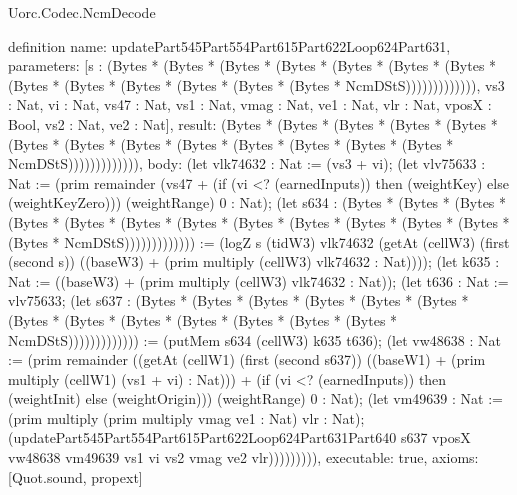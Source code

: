 \begin{lexlean}{Uorc.Codec.NcmDecode}
\begin{semanticmodule}
definition{
  name: updatePart545Part554Part615Part622Loop624Part631,
  parameters: [s : (Bytes * (Bytes * (Bytes * (Bytes * (Bytes * (Bytes * (Bytes * (Bytes * (Bytes * (Bytes * (Bytes * (Bytes * (Bytes * NcmDStS))))))))))))), vs3 : Nat, vi : Nat, vs47 : Nat, vs1 : Nat, vmag : Nat, ve1 : Nat, vlr : Nat, vposX : Bool, vs2 : Nat, ve2 : Nat],
  result: (Bytes * (Bytes * (Bytes * (Bytes * (Bytes * (Bytes * (Bytes * (Bytes * (Bytes * (Bytes * (Bytes * (Bytes * (Bytes * NcmDStS))))))))))))),
  body: (let vlk74632 : Nat := (vs3 + vi); (let vlv75633 : Nat := (prim remainder (vs47 + (if (vi <? (earnedInputs)) then (weightKey) else (weightKeyZero))) (weightRange) 0 : Nat); (let s634 : (Bytes * (Bytes * (Bytes * (Bytes * (Bytes * (Bytes * (Bytes * (Bytes * (Bytes * (Bytes * (Bytes * (Bytes * (Bytes * NcmDStS))))))))))))) := (logZ s (tidW3) vlk74632 (getAt (cellW3) (first (second s)) ((baseW3) + (prim multiply (cellW3) vlk74632 : Nat)))); (let k635 : Nat := ((baseW3) + (prim multiply (cellW3) vlk74632 : Nat)); (let t636 : Nat := vlv75633; (let s637 : (Bytes * (Bytes * (Bytes * (Bytes * (Bytes * (Bytes * (Bytes * (Bytes * (Bytes * (Bytes * (Bytes * (Bytes * (Bytes * NcmDStS))))))))))))) := (putMem s634 (cellW3) k635 t636); (let vw48638 : Nat := (prim remainder ((getAt (cellW1) (first (second s637)) ((baseW1) + (prim multiply (cellW1) (vs1 + vi) : Nat))) + (if (vi <? (earnedInputs)) then (weightInit) else (weightOrigin))) (weightRange) 0 : Nat); (let vm49639 : Nat := (prim multiply (prim multiply vmag ve1 : Nat) vlr : Nat); (updatePart545Part554Part615Part622Loop624Part631Part640 s637 vposX vw48638 vm49639 vs1 vi vs2 vmag ve2 vlr))))))))),
  executable: true,
  axioms: [Quot.sound, propext]
}


\end{semanticmodule}
\end{lexlean}
